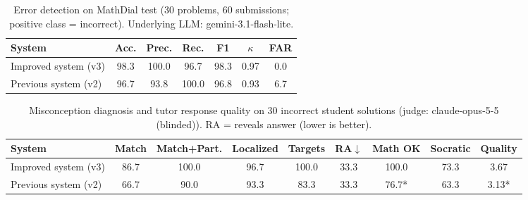 \begin{table}[t]\centering\small
\caption{Error detection on MathDial test (30 problems, 60 submissions; positive class = incorrect). Underlying LLM: gemini-3.1-flash-lite.}
\begin{tabular}{lcccccc}\toprule
System & Acc. & Prec. & Rec. & F1 & $\kappa$ & FAR \\\midrule
Improved system (v3) & 98.3 & 100.0 & 96.7 & 98.3 & 0.97 & 0.0 \\
Previous system (v2) & 96.7 & 93.8 & 100.0 & 96.8 & 0.93 & 6.7 \\
\bottomrule\end{tabular}\end{table}

\begin{table}[t]\centering\small
\caption{Misconception diagnosis and tutor response quality on 30 incorrect student solutions (judge: claude-opus-5-5 (blinded)). RA = reveals answer (lower is better).}
\begin{tabular}{lcccccccc}\toprule
System & Match & Match+Part. & Localized & Targets & RA$\downarrow$ & Math OK & Socratic & Quality \\\midrule
Improved system (v3) & 86.7 & 100.0 & 96.7 & 100.0 & 33.3 & 100.0 & 73.3 & 3.67 \\
Previous system (v2) & 66.7 & 90.0 & 93.3 & 83.3 & 33.3 & 76.7* & 63.3 & 3.13* \\
\bottomrule\end{tabular}\end{table}
